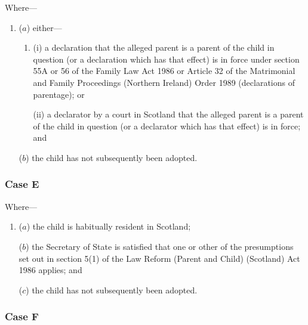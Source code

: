 \documentclass[a4paper]{article}
\begin{document}
Where---
\begin{enumerate}\item[]
($a$)
either---
\begin{enumerate}\item[]
 (i) a declaration that the alleged parent is a parent of the child in question (or a declaration which has that effect) is in force under section 55A or 56 of the Family Law Act 1986 or Article 32 of the Matrimonial and Family Proceedings (Northern Ireland) Order 1989 (declarations of parentage); or 

(ii) a declarator by a court in Scotland that the alleged parent is a parent of the child in question (or a declarator which has that effect) is in force; and
\end{enumerate}
($b$)
the child has not subsequently been adopted.
\end{enumerate}

%
%

\subsubsection*{Case E}

Where---
\begin{enumerate}\item[]
($a$) 
the child is habitually resident in Scotland; 

($b$) the Secretary of State is satisfied that one or other of the presumptions set out in section 5(1) of the Law Reform (Parent and Child) (Scotland) Act 1986 applies; and

($c$) the child has not subsequently been adopted.
\end{enumerate}

\subsubsection*{Case F}
\end{document}
